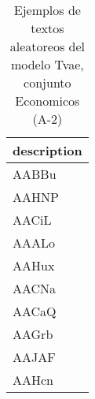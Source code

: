 \begin{table}[H]
\centering
\fontsize{8}{14}\selectfont
\caption{Ejemplos de textos aleatoreos del modelo Tvae, conjunto Economicos (A-2)}
\label{table-sample10-economicos-a-2-tvae-text}
\begin{tabular}{|m{50em}|}
\hline
\rowcolor[gray]{0.8}
description \\
\hline AABBu \\
\hline AAHNP \\
\hline AACiL \\
\hline AAALo \\
\hline AAHux \\
\hline AACNa \\
\hline AACaQ \\
\hline AAGrb \\
\hline AAJAF \\
\hline AAHcn \\
\hline
\end{tabular}
\end{table}
